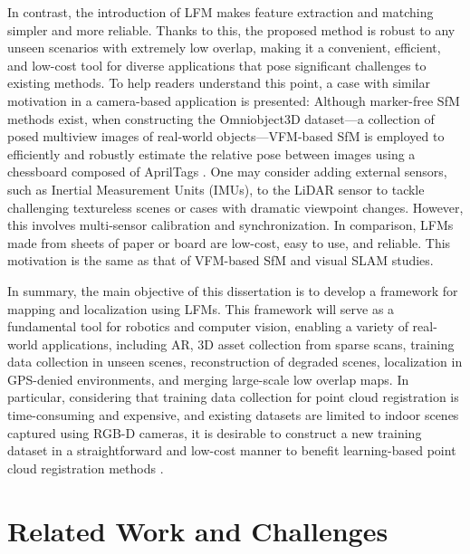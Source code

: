 %
In contrast, the introduction of LFM makes feature extraction and matching simpler and more reliable. Thanks to this, the proposed method is robust to any unseen scenarios with extremely low overlap, making it a convenient, efficient, and low-cost tool for diverse applications that pose significant challenges to existing methods.
%
To help readers understand this point, a case with similar motivation in a camera-based application is presented: Although marker-free SfM methods \cite{colmap,dust3r} exist, when constructing the Omniobject3D \cite{omni} dataset—a collection of posed multiview images of real-world objects—VFM-based SfM is employed to efficiently and robustly estimate the relative pose between images using a chessboard composed of AprilTags \cite{ap3}. 
%
One may consider adding external sensors, such as Inertial Measurement Units (IMUs), to the LiDAR sensor to tackle challenging textureless scenes or cases with dramatic viewpoint changes. However, this involves multi-sensor calibration and synchronization. In comparison, LFMs made from sheets of paper or board are low-cost, easy to use, and reliable. This motivation is the same as that of VFM-based SfM \cite{munoz,qingdao} and visual SLAM \cite{munoz2019,shuo} studies.
\par
In summary, the main objective of this dissertation is to develop a framework for mapping and localization using LFMs. This framework will serve as a fundamental tool for robotics and computer vision, enabling a variety of real-world applications, including AR, 3D asset collection from sparse scans, training data collection in unseen scenes, reconstruction of degraded scenes, localization in GPS-denied environments, and merging large-scale low overlap maps. In particular, considering that training data collection for point cloud registration is time-consuming and expensive, and existing datasets \cite{3dmatch,eth,scan} are limited to indoor scenes captured using RGB-D cameras, it is desirable to construct a new training dataset in a straightforward and low-cost manner to benefit learning-based point cloud registration methods \cite{sghr,mdgd}. 
\section{Related Work and Challenges}
\label{Challenges}

